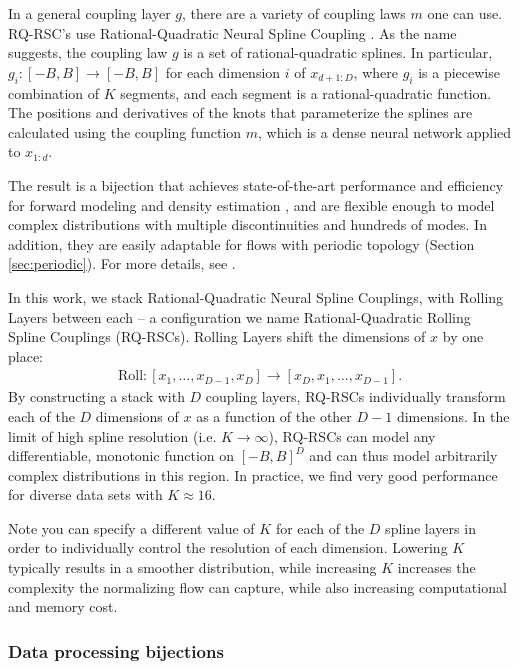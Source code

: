 \documentclass[twocolumn,twocolappendix,linenumbers]{aastex631}
\begin{document}
In a general coupling layer $g$, there are a variety of coupling laws $m$ one can use.
RQ-RSC's use Rational-Quadratic Neural Spline Coupling \citep{durkan2019}.
As the name  suggests, the coupling law $g$ is a set of rational-quadratic splines.
In particular, $g_i: [-B, B] \to [-B, B]$ for each dimension $i$ of $x_{d+1:D}$, where $g_i$ is a piecewise combination of $K$ segments, and each segment is a rational-quadratic function.
The positions and derivatives of the knots that parameterize the splines are calculated using the coupling function $m$, which is a dense neural network applied to $x_{1:d}$.

The result is a bijection that achieves state-of-the-art performance and efficiency for forward modeling and density estimation \citep{kobyzev2020}, and are flexible enough to model complex distributions with multiple discontinuities and hundreds of modes.
In addition, they are easily adaptable for flows with periodic topology (Section \ref{sec:periodic}).
For more details, see \citet{durkan2019}.

In this work, we stack Rational-Quadratic Neural Spline Couplings, with Rolling Layers between each -- a configuration we name Rational-Quadratic Rolling Spline Couplings (RQ-RSCs).
Rolling Layers shift the dimensions of $x$ by one place:
\begin{align}
    \mathrm{Roll}: [x_1, \dots , x_{D-1}, x_D] \to [x_D, x_1, \dots , x_{D-1}].
\end{align}
By constructing a stack with $D$ coupling layers, RQ-RSCs individually transform each of the $D$ dimensions of $x$ as a function of the other $D-1$ dimensions.
In the limit of high spline resolution (i.e. $K \to \infty$), RQ-RSCs can model any differentiable, monotonic function on $[-B, B]^D$ and can thus model arbitrarily complex distributions in this region.
In practice, we find very good performance for diverse data sets with $K \approx 16$.

Note you can specify a different value of $K$ for each of the $D$ spline layers in order to individually control the resolution of each dimension.
Lowering $K$ typically results in a smoother distribution, while increasing $K$ increases the complexity the normalizing flow can capture, while also increasing computational and memory cost.

\subsubsection{Data processing bijections}
\label{sec:data-processing}
\end{document}

